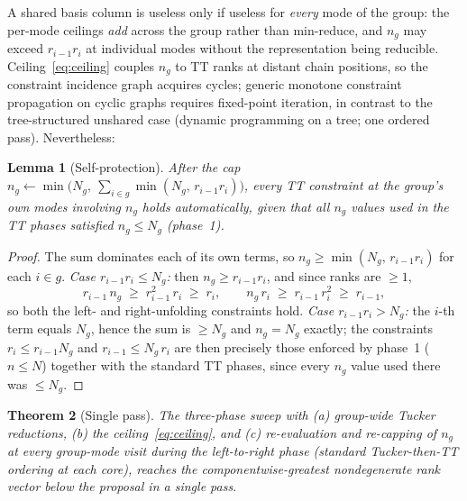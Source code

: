 \documentclass[11pt]{article}
\newtheorem{theorem}{Theorem}[section]
\newtheorem{lemma}[theorem]{Lemma}
\theoremstyle{definition}
\theoremstyle{remark}
\begin{document}
A shared basis column is useless only if useless for \emph{every} mode of the
group: the per-mode ceilings \emph{add} across the group rather than
min-reduce, and $n_g$ may exceed $r_{i-1} r_i$ at individual modes without
the representation being reducible. Ceiling~\eqref{eq:ceiling} couples $n_g$
to TT ranks at distant chain positions, so the constraint incidence graph
acquires cycles; generic monotone constraint propagation on cyclic graphs
requires fixed-point iteration, in contrast to the tree-structured unshared
case (dynamic programming on a tree; one ordered pass). Nevertheless:

\begin{lemma}[Self-protection]\label{lem:selfprotect}
After the cap
$n_g \leftarrow \min\bigl(N_g,\ \sum_{i\in g} \min(N_g,\, r_{i-1}r_i)\bigr)$,
every TT constraint at the group's own modes involving $n_g$ holds
automatically, given that all $n_g$ values used in the TT phases satisfied
$n_g \leq N_g$ (phase~1).
\end{lemma}

\begin{proof}
The sum dominates each of its own terms, so
$n_g \geq \min(N_g,\, r_{i-1} r_i)$ for each $i \in g$.
\emph{Case $r_{i-1} r_i \leq N_g$:} then $n_g \geq r_{i-1} r_i$, and since
ranks are $\geq 1$,
\[
r_{i-1}\, n_g \;\geq\; r_{i-1}^2\, r_i \;\geq\; r_i,
\qquad
n_g\, r_i \;\geq\; r_{i-1}\, r_i^2 \;\geq\; r_{i-1},
\]
so both the left- and right-unfolding constraints hold.
\emph{Case $r_{i-1} r_i > N_g$:} the $i$-th term equals $N_g$, hence the sum
is $\geq N_g$ and $n_g = N_g$ exactly; the constraints
$r_i \leq r_{i-1} N_g$ and $r_{i-1} \leq N_g\, r_i$ are then precisely those
enforced by phase~1 ($n \leq N$) together with the standard TT phases, since
every $n_g$ value used there was $\leq N_g$.
\end{proof}

\begin{theorem}[Single pass]\label{thm:singlepass}
The three-phase sweep with (a) group-wide Tucker reductions, (b) the
ceiling~\eqref{eq:ceiling}, and (c) re-evaluation and re-capping of $n_g$ at
every group-mode visit during the left-to-right phase (standard
Tucker-then-TT ordering at each core), reaches the componentwise-greatest
nondegenerate rank vector below the proposal in a single pass.
\end{theorem}
\end{document}
